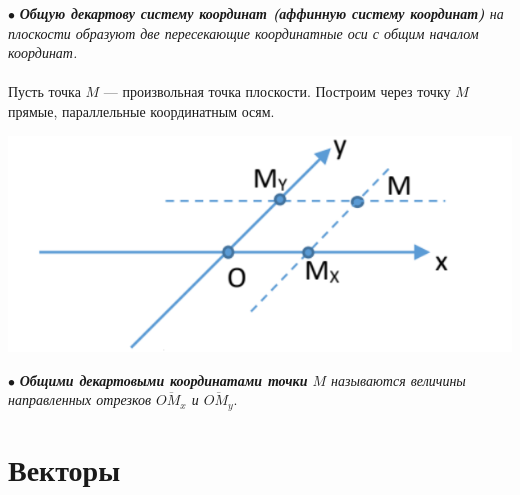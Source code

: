 $\bullet$ \textit{\textbf{Общую декартову систему координат (аффинную систему координат)} на плоскости образуют две пересекающие координатные оси с общим началом координат.}\\\\
Пусть точка $M$ --- произвольная точка плоскости. Построим через точку $M$ прямые, параллельные координатным осям.\begin{center}
	\includegraphics[scale=0.3]{images/odsk.png}
\end{center}
$\bullet$ \textit{\textbf{Общими декартовыми координатами точки} $M$ называются величины направленных отрезков $\overline{OM_x}$ и $\overline{OM_y}$}.











\chapter{Векторы}
